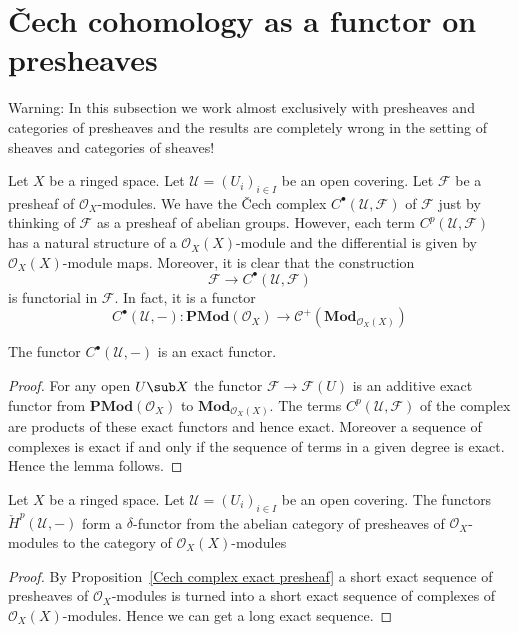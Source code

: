 \section{\v{C}ech cohomology as a functor on presheaves}
Warning: In this subsection we work almost exclusively with presheaves and categories of presheaves and the results are completely wrong in the setting of sheaves and categories of sheaves!\par
Let $X$ be a ringed space. Let $\mathcal{U}=(U_i)_{i\in I}$ be an open covering. Let $\mathscr{F}$ be a presheaf of $\mathcal{O}_X$-modules. We have the \v{C}ech complex $C^\bullet(\mathcal{U},\mathscr{F})$ of $\mathscr{F}$ just by thinking of $\mathscr{F}$ as a presheaf of abelian groups. However, each term $C^p(\mathcal{U},\mathscr{F})$ has a natural structure of a $\mathcal{O}_X(X)$-module and the differential is given by $\mathcal{O}_X(X)$-module maps. Moreover, it is clear that the construction
\[\mathscr{F}\to C^\bullet(\mathcal{U},\mathscr{F})\]
is functorial in $\mathscr{F}$. In fact, it is a functor
\[C^\bullet(\mathcal{U},-):\mathbf{PMod}(\mathscr{O}_X)\to\mathcal{C}^+(\mathbf{Mod}_{\mathscr{O}_X(X)})\]
\begin{proposition}\label{Cech complex exact presheaf}
The functor $C^\bullet(\mathcal{U},-)$ is an exact functor.
\end{proposition}
\begin{proof}
For any open $U\sub X$ the functor $\mathscr{F}\to\mathscr{F}(U)$ is an additive exact functor from $\mathbf{PMod}(\mathcal{O}_X)$ to $\mathbf{Mod}_{\mathscr{O}_X(X)}$. The terms $C^p(\mathcal{U},\mathscr{F})$ of the complex are products of these exact functors and hence exact. Moreover a sequence of complexes is exact if and only if the sequence of terms in a given degree is exact. Hence the lemma follows.
\end{proof}
\begin{theorem}\label{Cech presheaf delta functor}
Let $X$ be a ringed space. Let $\mathcal{U}=(U_i)_{i\in I}$ be an open covering. The functors $\check{H}^p(\mathcal{U},-)$ form a $\delta$-functor from the abelian category of presheaves of $\mathscr{O}_X$-modules to the category of $\mathscr{O}_X(X)$-modules
\end{theorem}
\begin{proof}
By Proposition~\ref{Cech complex exact presheaf} a short exact sequence of presheaves of $\mathscr{O}_X$-modules is turned into a short exact sequence of complexes of $\mathscr{O}_X(X)$-modules. Hence we can get a long exact sequence.
\end{proof}
